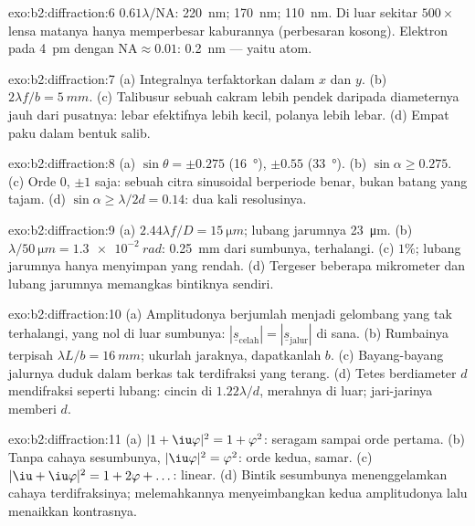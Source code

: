 \begin{solution}{exo:b2:diffraction:6}
$0.61\lambda/\mathrm{NA}$: \qty{220}{nm}; \qty{170}{nm}; \qty{110}{nm}. Di luar sekitar $500\times$
lensa matanya hanya memperbesar kaburannya (perbesaran kosong). Elektron
pada \qty{4}{pm} dengan $\mathrm{NA} \approx 0.01$: \qty{0.2}{nm} --- yaitu atom.
\end{solution}

\begin{solution}{exo:b2:diffraction:7}
(a) Integralnya terfaktorkan dalam $x$ dan $y$. (b) $2\lambda f/b = \qty{5}{mm}$. (c) Talibusur
sebuah cakram lebih pendek daripada diameternya jauh dari pusatnya: lebar
efektifnya lebih kecil, polanya lebih lebar. (d) Empat paku 
dalam bentuk salib.
\end{solution}

\begin{solution}{exo:b2:diffraction:8}
(a) $\sin\theta = \pm0.275$ (\qty{16}{\degree}), $\pm0.55$ (\qty{33}{\degree}). (b) $\sin\alpha \ge 0.275$.
(c) Orde $0$, $\pm1$ saja: sebuah citra sinusoidal berperiode benar, bukan
batang yang tajam. (d) $\sin\alpha \ge \lambda/2d = 0.14$: dua kali resolusinya.
\end{solution}

\begin{solution}{exo:b2:diffraction:9}
(a) $2.44\lambda f/D = \qty{15}{\micro m}$; lubang jarumnya \qty{23}{\micro m}. (b) $\lambda/\qty{50}{\micro m} =
\qty{1.3e-2}{rad}$: \qty{0.25}{mm} dari sumbunya, terhalangi. (c) $1\%$; lubang jarumnya hanya menyimpan
 yang rendah. (d) Tergeser beberapa mikrometer dan
lubang jarumnya memangkas bintiknya sendiri.
\end{solution}

\begin{solution}{exo:b2:diffraction:10}
(a) Amplitudonya berjumlah menjadi gelombang yang tak terhalangi, yang nol di luar sumbunya:
$|\underline s_{\text{celah}}| = |\underline s_{\text{jalur}}|$ di sana. (b) Rumbainya terpisah $\lambda L/b =
\qty{16}{mm}$; ukurlah jaraknya, dapatkanlah $b$. (c) Bayang-bayang jalurnya duduk
dalam berkas tak terdifraksi yang terang. (d) Tetes berdiameter $d$ mendifraksi
seperti lubang: cincin di $1.22\lambda/d$, merahnya di luar; jari-jarinya memberi $d$.
\end{solution}

\begin{solution}{exo:b2:diffraction:11}
(a) $|1 + \iu\varphi|^2 = 1 + \varphi^2$: seragam sampai orde pertama. (b) Tanpa
cahaya sesumbunya, $|\iu\varphi|^2 = \varphi^2$: orde kedua, samar. (c) $|\iu + \iu\varphi|^2 =
1 + 2\varphi + \dots$: linear. (d) Bintik sesumbunya menenggelamkan cahaya
terdifraksinya; melemahkannya menyeimbangkan kedua amplitudonya lalu menaikkan kontrasnya.
\end{solution}

